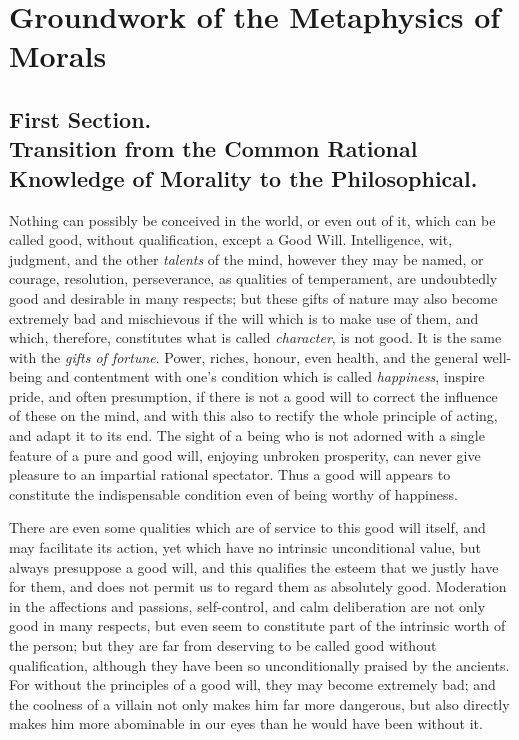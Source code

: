 
\author{Immanuel Kant}
\chapter[Groundwork of the Metaphysics of Morals, excerpt]{Groundwork
of the Metaphysics of Morals}

\section{First Section.\\\smaller Transition from the Common
Rational Knowledge of Morality to the Philosophical.}

Nothing can possibly be conceived in the world, or even out of it,
which can be called good, without qualification, except a Good Will.
Intelligence, wit, judgment, and the other \textit{talents} of the
mind, however they may be named, or courage, resolution, perseverance,
as qualities of temperament, are undoubtedly good and desirable in
many respects; but these gifts of nature may also become extremely bad
and mischievous if the will which is to make use of them, and which,
therefore, constitutes what is called \textit{character}, is not good.
It is the same with the \textit{gifts of fortune}. Power, riches,
honour, even health, and the general well-being and contentment with
one's condition which is called \textit{happiness}, inspire pride, and
often presumption, if there is not a good will to correct the
influence of these on the mind, and with this also to rectify the
whole principle of acting, and adapt it to its end. The sight of a
being who is not adorned with a single feature of a pure and good
will, enjoying unbroken prosperity, can never give pleasure to an
impartial rational spectator. Thus a good will appears to constitute
the indispensable condition even of being worthy of happiness.

There are even some qualities which are of service to this good will
itself, and may facilitate its action, yet which have no intrinsic
unconditional value, but always presuppose a good will, and this
qualifies the esteem that we justly have for them, and does not permit
us to regard them as absolutely good. Moderation in the affections and
passions, self-control, and calm deliberation are not only good in
many respects, but even seem to constitute part of the intrinsic worth
of the person; but they are far from deserving to be called good
without  qualification, although they have been so
unconditionally praised by the ancients. For without the principles of
a good will, they may become extremely bad; and the coolness of a
villain not only makes him far more dangerous, but also directly makes
him more abominable in our eyes than he would have been without it.


